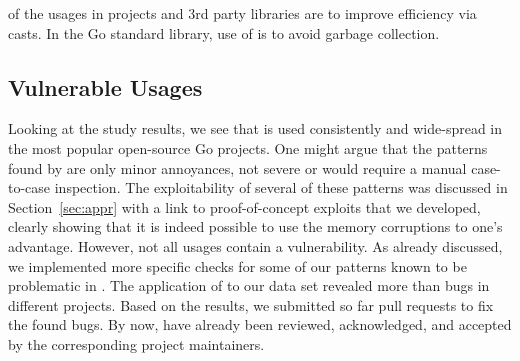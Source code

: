 \begin{tcolorbox}[boxsep=1pt, enlarge top by=5pt, title=Answer to \ref{rq:purpose}]
 of the \unsafe{} usages in projects and 3rd party libraries are to improve efficiency via \unsafe{} casts.
In the Go standard library,  use of \unsafe{} is to avoid garbage collection. 
\end{tcolorbox}


\subsection{Vulnerable Usages}
\label{sec:discussion}
Looking at the study results, we see that \unsafe{} is used consistently and wide-spread in the most popular open-source Go projects.
One might argue that the patterns found by \toolUsage{} are only minor annoyances, not severe or would require a manual case-to-case inspection. 
The exploitability of several of these patterns was discussed in Section~\ref{sec:appr} with a link to proof-of-concept exploits that we developed, clearly showing that it is indeed possible to use the memory corruptions to one's advantage.
However, not all \unsafe{} usages contain a vulnerability. 
As already discussed, we implemented more specific checks for some of our patterns known to be problematic in \toolSA{}.
The application of \toolSA{} to our data set revealed more than \numberBugsFixed{} bugs in different projects.
Based on the results, we submitted so far \numberPRs{} pull requests to fix the found bugs. %
By now, \numberPRsMerged{} have already been reviewed, acknowledged, and accepted by the corresponding project maintainers.